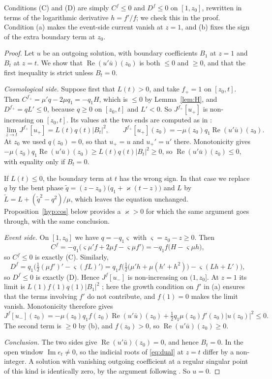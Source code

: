 \documentclass[11pt]{amsart}
\theoremstyle{definition}
\theoremstyle{remark}
\numberwithin{equation}{section}
\renewcommand{\Im}{\operatorname{Im}}
\renewcommand{\Re}{\operatorname{Re}}
\begin{document}
Conditions (C) and (D) are simply $C^f\le0$ and $D^f\le0$ on $[1,z_0]$, rewritten in terms of the logarithmic
derivative $h=f'/f$; we check this in the proof. Condition (a) makes the event-side current vanish at $z=1$, and (b)
fixes the sign of the extra boundary term at $z_0$.

\begin{proof}
Let $u$ be an outgoing solution, with boundary coefficients $B_1$ at $z=1$ and $B_t$ at $z=t$. We show that
$\Re(u'\bar u)(z_0)$ is both $\le0$ and $\ge0$, and that the first inequality is strict unless $B_t=0$.

\emph{Cosmological side.} Suppose first that $L(t)>0$, and take $f_+=1$ on $[z_0,t]$. Then
$C^{f_+}=\mu'q-2\mu q_1=-q_1H$, which is $\le0$ by Lemma~\ref{lem:H}, and $D^{f_+}=qL'\le0$, because $q\ge0$ on
$[z_0,t]$ and $L'<0$. So $J^{f_+}[u_+]$ is non-increasing on $[z_0,t]$. Its values at the two ends are computed as in
\cite[Lemma~4.2]{Hin26}:
\[
\lim_{z\to t}J^{f_+}[u_+]=L(t)q(t)|B_t|^2,\qquad J^{f_+}[u_+](z_0)=-\mu(z_0)q_1\Re(u'\bar u)(z_0).
\]
At $z_0$ we used $q(z_0)=0$, so that $u_+=u$ and $u_+'=u'$ there. Monotonicity gives
$-\mu(z_0)q_1\Re(u'\bar u)(z_0)\ge L(t)q(t)|B_t|^2\ge0$, so $\Re(u'\bar u)(z_0)\le0$, with equality only if $B_t=0$.

If $L(t)\le0$, the boundary term at $t$ has the wrong sign. In that case we replace $q$ by the bent phase
$\tilde q=(z-z_0)\big(q_1+\varkappa(t-z)\big)$ and $L$ by $\tilde L=L+(\tilde q^2-q^2)/\mu$, which leaves the equation
unchanged. Proposition~\ref{hyp:cos} below provides a $\varkappa>0$ for which the same argument goes through, with the
same conclusion.

\emph{Event side.} On $[1,z_0]$ we have $q=-q_1\varsigma$ with $\varsigma=z_0-z\ge0$. Then
\[
C^f=-q_1\big(\varsigma\mu'f+2\mu f-\varsigma\mu f'\big)=-q_1f\big(H-\varsigma\mu h\big),
\]
so $C^f\le0$ is exactly (C). Similarly,
\[
D^f=q_1\Big(\tfrac12(\mu f')'-\varsigma(fL)'\Big)
=q_1f\Big(\tfrac12\big(\mu'h+\mu(h'+h^2)\big)-\varsigma(Lh+L')\Big),
\]
so $D^f\le0$ is exactly (D). Hence $J^f[u_-]$ is non-increasing on $(1,z_0]$. At $z=1$ its limit is
$L(1)f(1)q(1)|B_1|^2$ \cite[Lemma~4.2]{Hin26}; here the growth condition on $f'$ in (a) ensures that the terms
involving $f'$ do not contribute, and $f(1)=0$ makes the limit vanish. Monotonicity therefore gives
\[
J^f[u_-](z_0)=-\mu(z_0)q_1f(z_0)\Re(u'\bar u)(z_0)+\tfrac12q_1\mu(z_0)f'(z_0)|u(z_0)|^2\le0 .
\]
The second term is $\ge0$ by (b), and $f(z_0)>0$, so $\Re(u'\bar u)(z_0)\ge0$.

\emph{Conclusion.} The two sides give $\Re(u'\bar u)(z_0)=0$, and hence $B_t=0$. In the open window $\Im e_t\ne0$, so
the indicial roots of \eqref{eq:dual} at $z=t$ differ by a non-integer. A solution with vanishing outgoing coefficient
at a regular singular point of this kind is identically zero, by the argument following \cite[(3.6)]{Hin26}. So $u=0$.
\end{proof}
\end{document}

